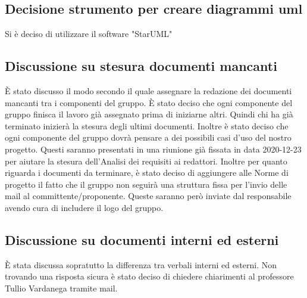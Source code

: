 \subsection*{Decisione strumento per creare diagrammi uml}
Si è deciso di utilizzare il software "StarUML"

\subsection*{Discussione su stesura documenti mancanti}
È stato discusso il modo secondo il quale assegnare la redazione dei documenti mancanti tra i componenti del gruppo. 
È stato deciso che ogni componente del gruppo finisca il lavoro già assegnato prima di iniziarne altri. Quindi chi ha già terminato inizierà la stesura degli ultimi documenti. 
Inoltre è stato deciso che ogni componente del gruppo dovrà pensare a dei possibili casi d'uso del nostro progetto. Questi saranno presentati in una riunione già fissata in data 2020-12-23 per aiutare la stesura dell'Analisi dei requisiti ai redattori. 
Inoltre per quanto riguarda i documenti da terminare, è stato deciso di aggiungere alle Norme di progetto il fatto che il gruppo non seguirà una struttura fissa per l'invio delle mail al committente/proponente. Queste saranno però inviate dal responsabile avendo cura di includere il logo del gruppo.

\subsection*{Discussione su documenti interni ed esterni}
È stata discussa sopratutto la differenza tra verbali interni ed esterni. Non trovando una risposta sicura è stato deciso di chiedere chiarimenti al professore Tullio Vardanega tramite mail.		


			





